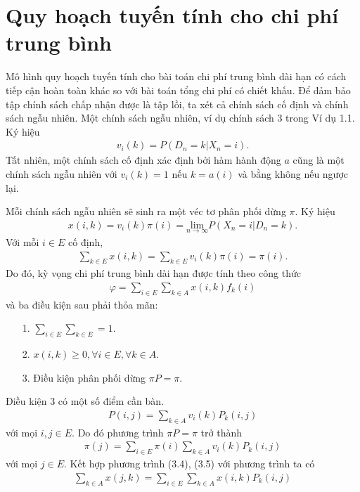 \documentclass[12pt,a4paper]{report}
\begin{document}
\section{Quy hoạch tuyến tính cho chi phí trung bình}
Mô hình quy hoạch tuyến tính cho bài toán chi phí trung bình dài hạn có cách tiếp cận hoàn toàn khác so với bài toán tổng chi phí có chiết khấu. Để đảm bảo tập chính sách chấp nhận được là tập lồi, ta xét cả chính sách cố định và chính sách ngẫu nhiên. Một chính sách ngẫu nhiên, ví dụ chính sách 3 trong Ví dụ 1.1. Ký hiệu
\begin{align*}
v_i(k)=P(D_n=k|X_n=i).
\end{align*}
Tất nhiên, một chính sách cố định xác định bởi hàm hành động $a$  cũng là một chính sách ngẫu nhiên với $v_i(k)=1$ nếu $k=a(i)$ và bằng không nếu ngược lại. 

\medskip
\noindent
Mỗi chính sách ngẫu nhiên sẽ sinh ra một véc tơ phân phối dừng $\pi$. Ký hiệu
\begin{align}
x(i,k)=v_i(k)\pi(i)=\underset{n \rightarrow \infty}{\mathrm{lim}}P(X_n=i|D_n=k).
\end{align}
Với mỗi $i \in E$ cố định, 
\begin{align}
\sum _{k\in E}x(i,k)=\sum_{k\in E}v_i(k)\pi(i)=\pi(i).
\end{align}
Do đó, kỳ vọng chi phí trung bình dài hạn được tính theo công thức
\begin{align*}
\varphi =\sum_{i\in E} \sum_{k \in A} x(i,k)f_k(i)
\end{align*}
và ba điều kiện sau phải thỏa mãn:
\begin{itemize}
	\item[1.] $\sum_{i \in E}\sum_{k \in E}=1.$
	\item[2.]$x(i,k) \geq 0 ,\forall i \in E, \forall k \in A$.
	\item[3.]Điều kiện phân phối dừng $\pi P=\pi$.
\end{itemize}
Điều kiện 3 có một số điểm cần bàn. 
\begin{align*}
P(i,j)=\sum_{k\in A}v_i(k)P_k(i,j)
\end{align*}
với mọi $i,j \in E$. Do đó phương trình $\pi P=\pi$ trở thành
\begin{align*}
\pi (j) = \sum_{i\in E}\pi(i) \sum_{k\in A}v_i(k)P_k(i,j)
\end{align*}
với mọi $j \in E$. Kết hợp phương trình (3.4), (3.5) với phương trình ta có
\begin{align*}
\sum_{k \in A}x(j,k)=\sum_{i \in E}\sum_{k \in A}x(i,k)P_k(i,j)
\end{align*} 
   
\end{document}
